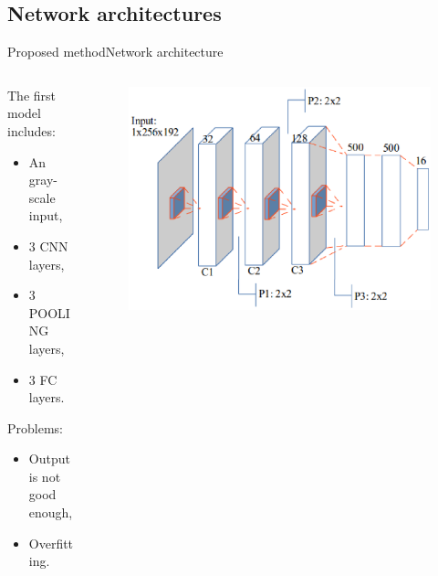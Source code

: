 \documentclass[10pt]{beamer}
\begin{document}
\subsection{Network architectures}
\begin{frame}{Proposed method}{Network architecture}

  \begin{columns}
		\begin{column}{0.45\textwidth}
			The first model includes: 
			\small{
			\begin{itemize}
				\item An gray-scale input,
    			\item $3$ CNN layers,
    			\item $3$ POOLING layers,
    			\item $3$ FC layers.
  			\end{itemize}}
  			Problems:
  			\small{
  			\begin{itemize}
  				\item Output is not good enough,
  				\item Overfitting.
  			\end{itemize}
  			}
		\end{column}
		\begin{column}{0.6\textwidth}  %
    		\begin{center}
     			\begin{figure}[htbp]
        			\centering
        			\includegraphics[scale=.4]{images/architecture1}
    				\label{figrsexample1}
				\end{figure}
     		\end{center}
		\end{column}
	\end{columns}~\\
\end{frame}
\end{document}
